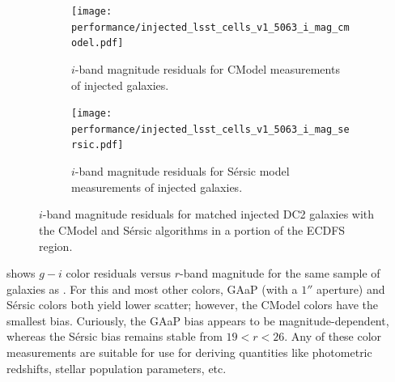 \begin{figure}[hbt!]
  \centering
  \begin{subfigure}[t]{0.45\textwidth}
  \texttt{[image: performance/injected\_lsst\_cells\_v1\_5063\_i\_mag\_cmodel.pdf]}
  \caption{$i$-band magnitude residuals for CModel measurements of injected galaxies.}
  \end{subfigure}\hfill
  \begin{subfigure}[t]{0.45\textwidth}
  \texttt{[image: performance/injected\_lsst\_cells\_v1\_5063\_i\_mag\_sersic.pdf]}
  \caption{$i$-band magnitude residuals for S\'ersic model measurements of injected galaxies.}
  \end{subfigure}\hfill
\caption{$i$-band magnitude residuals for matched injected DC2 galaxies with the CModel and S\'ersic algorithms in a portion of the \gls{ECDFS} region.}
\label{fig:injected_lsst_cells_v1_5063_i_mag}
\vspace{0.1cm}
\end{figure}
 shows $g-i$ color residuals versus $r$-band magnitude for the same sample of galaxies as .
For this and most other colors, \gls{GAaP} (with a $1''$ aperture) and S\'ersic colors both yield lower scatter; however, the CModel colors have the smallest bias.
Curiously, the \gls{GAaP} bias appears to be magnitude-dependent, whereas the S\'ersic bias remains stable from $19<r<26$.
Any of these color measurements are suitable for use for deriving quantities like photometric redshifts, stellar population parameters, etc.

